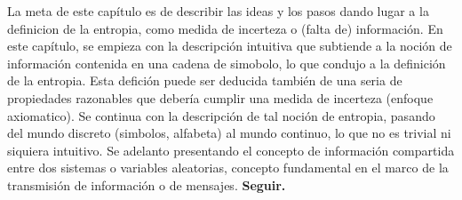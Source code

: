 {\color{red} La  meta de este cap\'itulo es  de describir las ideas  y los pasos
  dando lugar a la definicion de  la entropia, como medida de incerteza o (falta
  de)  informaci\'on.   En este  cap\'itulo,  se  empieza  con la  descripci\'on
  intuitiva que subtiende a la noci\'on de informaci\'on contenida en una cadena
  de simobolo, lo que condujo a  la definici\'on de la entropia. Esta defici\'on
  puede  ser deducida  tambi\'en  de  una seria  de  propiedades razonables  que
  deber\'ia cumplir  una medida de incerteza (enfoque  axiomatico).  Se continua
  con la descripci\'on  de tal noci\'on de entropia,  pasando del mundo discreto
  (simbolos,  alfabeta) al  mundo continuo,  lo que  no es  trivial  ni siquiera
  intuitivo.  Se  adelanto presentando  el concepto de  informaci\'on compartida
  entre dos sistemas o variables aleatorias, concepto fundamental en el marco de
  la transmisi\'on de informaci\'on o de mensajes. \bf Seguir. }
